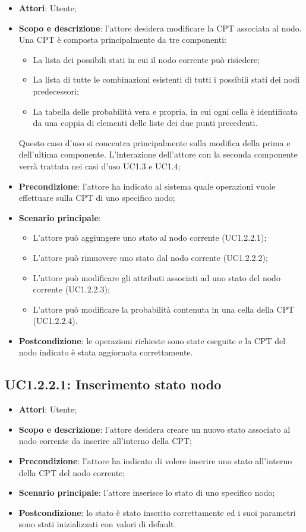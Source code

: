 \begin{itemize} 
	\item{\textbf{Attori}: Utente;} 
	\item{\textbf{Scopo e descrizione}: l'attore desidera modificare la CPT associata al nodo. Una CPT è composta principalmente da tre componenti: 
		\begin{itemize} 
			\item{La lista dei possibili stati in cui il nodo corrente può risiedere;} 
			\item{La lista di tutte le combinazioni esistenti di tutti i possibili stati dei nodi predecessori;} 
			\item{La tabella delle probabilità vera e propria, in cui ogni cella è identificata da una coppia di elementi delle liste dei due punti precedenti.} 
		\end{itemize} 
		Questo caso d'uso si concentra principalmente sulla modifica della prima e dell'ultima componente. L'interazione dell'attore con la seconda componente verrà trattata nei casi d'uso UC1.3 e UC1.4;
	} 
	\item{\textbf{Precondizione}: l'attore ha indicato al sistema quale operazioni vuole effettuare sulla CPT di uno specifico nodo;} 
	\item{\textbf{Scenario principale}: } 
	\begin{itemize} 
		\item{L'attore può aggiungere uno stato al nodo corrente (UC1.2.2.1);} 
		\item{L'attore può rimuovere uno stato dal nodo corrente (UC1.2.2.2);} 
		\item{L'attore può modificare gli attributi associati ad uno stato del nodo corrente (UC1.2.2.3);} 
		\item{L'attore può modificare la probabilità contenuta in una cella della CPT (UC1.2.2.4).} 
	\end{itemize} 
	\item{\textbf{Postcondizione}: le operazioni richieste sono state eseguite e la CPT del nodo indicato è stata aggiornata correttamente.} 
\end{itemize} 
\subsection{UC1.2.2.1: Inserimento stato nodo} 
\hypertarget{UC1.2.2.1}{} 
\begin{itemize} 
	\item{\textbf{Attori}: Utente;} 
	\item{\textbf{Scopo e descrizione}: l'attore desidera creare un nuovo stato associato al nodo corrente da inserire all'interno della CPT;} 
	\item{\textbf{Precondizione}: l'attore ha indicato di volere inserire uno stato all'interno della CPT del nodo corrente;}
	\item{\textbf{Scenario principale}: l'attore inserisce lo stato di uno specifico nodo;} 
	\item{\textbf{Postcondizione}: lo stato è stato inserito correttamente ed i suoi parametri sono stati inizializzati con valori di default.} 
\end{itemize} 
